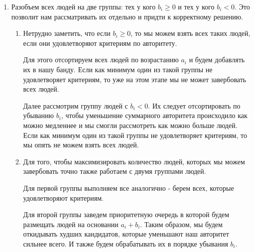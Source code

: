 \begin{enumerate}
    Тем самым за \( O(n) \) мы находим максимальную башню, однако сортировка
    атлетов по массе и силе занимает \( O(n \log n) \).



\item

    Разобъем всех людей на две группы: тех у кого $b_i \geq 0$ и тех у кого $b_i < 0$.
    Это позволит нам рассматривать их отдельно и придти к корректному решению.

    \begin{enumerate}

    \item

        Нетрудно заметить, что если $b_i \geq 0$, то мы можем взять всех таких людей, если они удовлетворяют
        критериям по авторитету.

        Для этого отсортируем всех людей по возрастанию $a_i$ и будем добавлять их в нашу банду.
        Если как минимум один из такой группы не удовлетворяет критериям, то уже на
        этом этапе мы не может завербовать всех людей.

        Далее рассмотрим группу людей с $b_i < 0$.
        Их следует отсортировать по убыванию $b_i$, чтобы уменьшение суммарного авторитета происходило как
        можно медленнее и мы смогли рассмотреть как можно больше людей.
        Если как минимум один из такой группы не удовлетворяет критериям, то мы опять не можем
        взять всех людей.


    \item

        Для того, чтобы максимизировать количество людей, которых мы можем завербовать точно также
        работаем с двумя группами людей.

        Для первой группы выполняем все аналогично - берем всех, которые удовлетворяют критериям.

        Для второй группы заведем приоритетную очередь в которой будем размещать людей на основании
        $a_i + b_i$. Таким образом, мы будем откидывать худших кандидатов, которые уменьшают наш авторитет сильнее всего.
        И также будем обрабатывать их в порядке убывания $b_i$.


\end{enumerate}
\end{enumerate}
